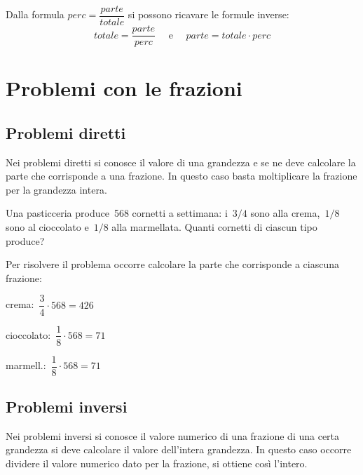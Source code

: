 Dalla formula \(perc = \dfrac{parte}{totale}\) si possono ricavare le
formule inverse:
\[totale = \dfrac{parte}{perc} \quad \text{ e } \quad
  parte = totale \cdot perc\]


\section{Problemi con le frazioni}
\label{sec:razionali_problemi}


\subsection{Problemi diretti}
Nei problemi diretti si conosce il valore di una grandezza e se ne deve
calcolare la parte che corrisponde a una frazione.
In questo caso basta moltiplicare la frazione per la grandezza intera.

 \begin{esempio}
Una pasticceria produce~568 cornetti a settimana: i~\(3/4\) sono alla
crema,~\(1/8\) sono al cioccolato e~\(1/8\) alla marmellata.
Quanti cornetti di ciascun tipo produce?

Per risolvere il problema occorre calcolare la parte che corrisponde a
ciascuna frazione:

\begin{multicols}{3}
\begin{itemize*}
\item crema:~\(\dfrac{3}{4}\cdot 568 =426\)
\item cioccolato:~\(\dfrac{1}{8}\cdot 568 =71\)
\item marmell.:~\(\dfrac{1}{8}\cdot 568 =71\)
\end{itemize*}
\end{multicols}
 \end{esempio}

\subsection{Problemi inversi}

Nei problemi inversi si conosce il valore numerico di una frazione di una
certa grandezza si deve calcolare il valore dell'intera grandezza.
In questo caso occorre dividere il valore numerico dato per la frazione,
si ottiene così l'intero.

